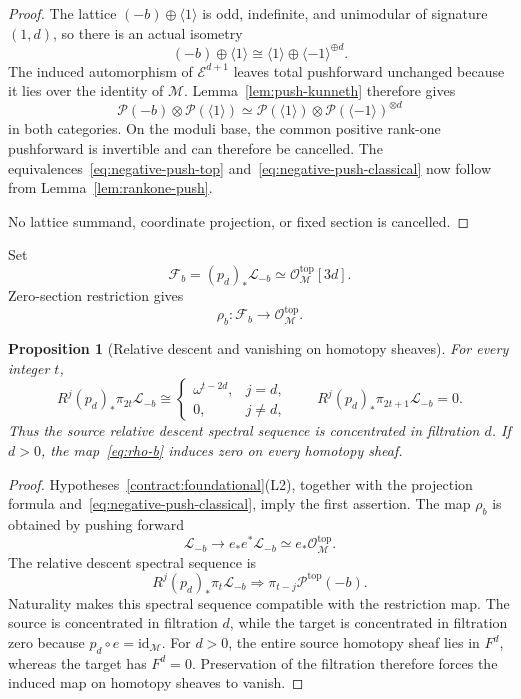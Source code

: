 \documentclass[11pt,a4paper]{amsart}
\newcommand{\cM}{\mathcal M}
\newcommand{\cE}{\mathcal E}
\newcommand{\cL}{\mathcal L}
\newcommand{\cO}{\mathcal O}
\theoremstyle{plain}
\newtheorem{proposition}[theorem]{Proposition}
\theoremstyle{definition}
\theoremstyle{remark}
\begin{document}
\begin{proof}
The lattice $(-b)\oplus\langle1\rangle$ is odd, indefinite,
and unimodular of signature $(1,d)$, so there is an actual isometry
\[
 (-b)\oplus\langle1\rangle
 \cong
 \langle1\rangle\oplus\langle-1\rangle^{\oplus d}.
\]
The induced automorphism of $\cE^{d+1}$ leaves total pushforward
unchanged because it lies over the identity of $\cM$.
Lemma~\ref{lem:push-kunneth} therefore gives
\[
 \mathcal P(-b)\otimes\mathcal P(\langle1\rangle)
 \simeq
 \mathcal P(\langle1\rangle)\otimes\mathcal P(\langle-1\rangle)^{\otimes d}
\]
in both categories. On the moduli base, the common positive rank-one
pushforward is invertible and can therefore be cancelled. The
equivalences~\eqref{eq:negative-push-top}
and~\eqref{eq:negative-push-classical} now follow from
Lemma~\ref{lem:rankone-push}.

No lattice summand, coordinate projection, or fixed section is cancelled.
\end{proof}

Set
\[
 \mathcal F_b=(p_d)_*\cL_{-b}\simeq\cO_{\cM}^{\mathrm{top}}[3d].
\]
Zero-section restriction gives
\begin{equation}\label{eq:rho-b}
 \rho_b:\mathcal F_b\longrightarrow\cO_{\cM}^{\mathrm{top}}.
\end{equation}

\begin{proposition}[Relative descent and vanishing on homotopy sheaves]\label{prop:ghost}
For every integer $t$,
\[
 R^j(p_d)_*\pi_{2t}\cL_{-b}\cong
 \begin{cases}
  \omega^{t-2d},&j=d,\\
  0,&j\ne d,
 \end{cases}
 \qquad
 R^j(p_d)_*\pi_{2t+1}\cL_{-b}=0.
\]
Thus the source relative descent spectral sequence is concentrated
in filtration $d$. If $d>0$, the map~\eqref{eq:rho-b} induces zero
on every homotopy sheaf.
\end{proposition}

\begin{proof}
Hypotheses~\ref{contract:foundational}\textup{(L2)}, together with the
projection formula and~\eqref{eq:negative-push-classical}, imply the
first assertion. The map $\rho_b$ is obtained by pushing forward
\[
 \cL_{-b}\longrightarrow e_*e^*\cL_{-b}\simeq e_*\cO_{\cM}^{\mathrm{top}}.
\]
The relative descent spectral sequence is
\[
 R^j(p_d)_*\pi_t\cL_{-b}
   \Longrightarrow\pi_{t-j}\mathcal P^{\mathrm{top}}(-b).
\]
Naturality makes this spectral sequence compatible with the restriction
map. The source is concentrated in filtration $d$, while the target
is concentrated in filtration zero because
$p_d\circ e=\mathrm{id}_{\cM}$. For $d>0$, the entire source
homotopy sheaf lies in $F^d$, whereas the target has $F^d=0$.
Preservation of the filtration therefore forces the induced map on
homotopy sheaves to vanish.
\end{proof}
\end{document}
